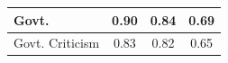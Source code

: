 \documentclass[12pt]{article}
\begin{document}
\begin{CJK*}{UTF8}{gbsn}
\begin{table}[hbt!]
\begin{tabular}{|l|c|c|c|}
		Govt. & 0.90 & 0.84 & 0.69 \\ \hline
		Govt. Criticism & 0.83 & 0.82 & 0.65 \\ \hline
	\end{tabular}
\end{table}
\newpage

\newpage



\end{CJK*}
\end{document}
